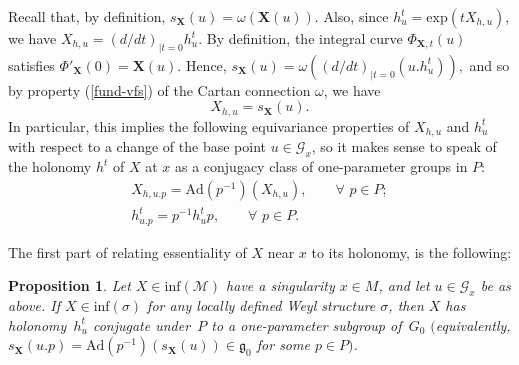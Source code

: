 \documentclass[pdftex]{sigma}
\def\g{\mathfrak{g}}
\def\Gbdle{\mathcal{G}}
\theoremstyle{plain}
\newtheorem{Proposition}[Theorem]{Proposition}
\theoremstyle{definition}
\begin{document}
Recall that, by def\/inition, $s_{\mathbf{X}}(u) = \omega(\mathbf{X}(u))$. Also, since $h_u^t = \mathrm{exp}(tX_{h,u})$, we have $X_{h,u} = (d/dt)_{\vert t=0} h_u^t$. By def\/inition, the integral curve $\Phi_{\mathbf{X},t}(u)$ satisf\/ies $\Phi'_{\mathbf{X}}(0) = \mathbf{X}(u)$. Hence, $s_{\mathbf{X}}(u) = \omega((d/dt)_{\vert t=0}(u.h_u^t)),$ and so by property (\ref{fund-vfs}) of the Cartan connection $\omega$, we have
\[
X_{h,u} = s_{\mathbf{X}}(u).
\]
In particular, this implies the following equivariance properties of $X_{h,u}$ and $h_u^t$ with respect to a change of the base point $u \in \Gbdle_x$, so it makes sense to speak of the holonomy $h^t$ of $X$ at $x$ as a conjugacy class of one-parameter groups in $P$:
\begin{gather*}
X_{h,u.p} = \mathrm{Ad}(p^{-1})(X_{h,u}), \qquad \forall \,\, p \in P;\\
h_{u.p}^t = p^{-1}h_u^tp, \qquad \forall \,\, p \in P.
\end{gather*}

The f\/irst part of relating essentiality of $X$ near $x$ to its holonomy, is the following:

\begin{Proposition} \label{necessary holonomy} Let $X \in \mathrm{inf}(\mathcal{M})$ have a singularity $x \in M$, and let $u \in \Gbdle_x$ be as above. If $X \in \mathrm{inf}(\sigma)$ for any locally defined Weyl structure $\sigma$, then $X$ has holonomy~$h_u^t$ conjugate under~$P$ to a one-parameter subgroup of~$G_0$ $($equivalently, $s_{\mathbf{X}}(u.p) = \mathrm{Ad}(p^{-1})(s_{\mathbf{X}}(u)) \in \g_0$ for some $p \in P)$.
\end{Proposition}
\end{document}
